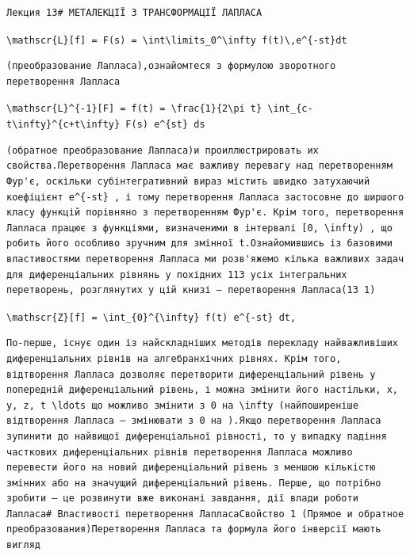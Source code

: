 \documentclass[
  ukrainian,
]{article}
\begin{document}
\begin{verbatim}
Лекция 13# МЕТАЛЕКЦІЇ З ТРАНСФОРМАЦІЇ ЛАПЛАСА
\end{verbatim}

\texttt{\textbackslash{}mathscr\{L\}{[}f{]}\ =\ F(s)\ =\ \textbackslash{}int\textbackslash{}limits\_0\^{}\textbackslash{}infty\ f(t)\textbackslash{},e\^{}\{-st\}dt}

\begin{verbatim}
(преобразование Лапласа),ознайомтеся з формулою зворотного перетворення Лапласа
\end{verbatim}

\texttt{\textbackslash{}mathscr\{L\}\^{}\{-1\}{[}F{]}\ =\ f(t)\ =\ \textbackslash{}frac\{1\}\{2\textbackslash{}pi\ t\}\ \textbackslash{}int\_\{c-t\textbackslash{}infty\}\^{}\{c+t\textbackslash{}infty\}\ F(s)\ e\^{}\{st\}\ ds}

\begin{verbatim}
(обратное преобразование Лапласа)и проиллюстрировать их свойства.Перетворення Лапласа має важливу перевагу над перетворенням Фур'є, оскільки субінтегративний вираз містить швидко затухаючий коефіцієнт e^{-st} , і тому перетворення Лапласа застосовне до ширшого класу функцій порівняно з перетворенням Фур'є. Крім того, перетворення Лапласа працює з функціями, визначеними в інтервалі [0, \infty) , що робить його особливо зручним для змінної t.Ознайомившись із базовими властивостями перетворення Лапласа ми розв'яжемо кілька важливих задач для диференціальних рівнянь у похідних 113 усіх інтегральних перетворень, розглянутих у цій книзі — перетворення Лапласа(13 1)
\end{verbatim}

\texttt{\textbackslash{}mathscr\{Z\}{[}f{]}\ =\ \textbackslash{}int\_\{0\}\^{}\{\textbackslash{}infty\}\ f(t)\ e\^{}\{-st\}\ dt,}

\begin{verbatim}
По-перше, існує один із найскладніших методів перекладу найважливіших диференціальних рівнів на алгебранхічних рівнях. Крім того, відтворення Лапласа дозволяє перетворити диференціальний рівень у попередній диференціальний рівень, і можна змінити його настільки, x, y, z, t \ldots що можливо змінити з 0 на \infty (найпоширеніше відтворення Лапласа — змінювати з 0 на ).Якщо перетворення Лапласа зупинити до найвищої диференціальної рівності, то у випадку падіння часткових диференціальних рівнів перетворення Лапласа можливо перевести його на новий диференціальний рівень з меншою кількістю змінних або на значущий диференціальний рівень. Перше, що потрібно зробити — це розвинути вже виконані завдання, дії влади роботи Лапласа# Властивості перетворення ЛапласаСвойство 1 (Прямое и обратное преобразования)Перетворення Лапласа та формула його інверсії мають вигляд
\end{verbatim}
\end{document}
